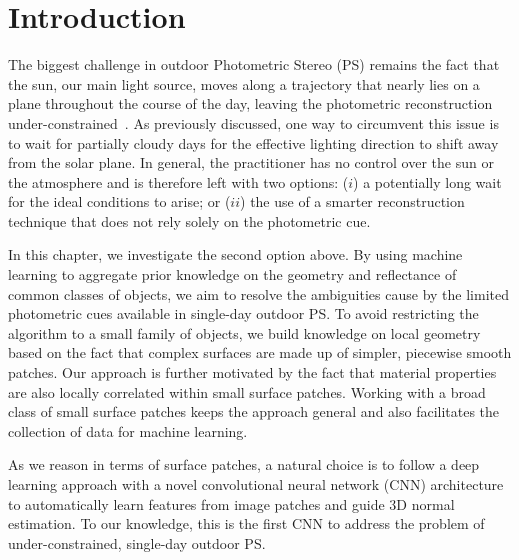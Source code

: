 \section{Introduction}

The biggest challenge in outdoor Photometric Stereo (PS) remains the fact that the sun, our main light source, moves along a trajectory that nearly lies on a plane throughout the course of the day, leaving the photometric reconstruction under-constrained~\cite{woodham-opteng-80}.
As previously discussed, one way to circumvent this issue is to wait for partially cloudy days for the effective lighting direction to shift away from the solar plane.
In general, the practitioner has no control over the sun or the atmosphere and is therefore left with two options: ($i$) a potentially long wait for the ideal conditions to arise; or ($ii$) the use of a smarter reconstruction technique that does not rely solely on the photometric cue.

In this chapter, we investigate the second option above. By using machine learning to aggregate prior knowledge on the geometry and reflectance of common classes of objects, we aim to resolve the ambiguities cause by the limited photometric cues available in single-day outdoor PS. To avoid restricting the algorithm to a small family of objects, we build knowledge on local geometry based on the fact that complex surfaces are made up of simpler, piecewise smooth patches. Our approach is further motivated by the fact that material properties are also locally correlated within small surface patches. Working with a broad class of small surface patches keeps the approach general and also facilitates the collection of data for machine learning.


As we reason in terms of surface patches, a natural choice is to follow a deep learning approach with a novel convolutional neural network (CNN) architecture to automatically learn features from image patches and guide 3D normal estimation. To our knowledge, this is the first CNN to address the problem of under-constrained, single-day outdoor PS.

